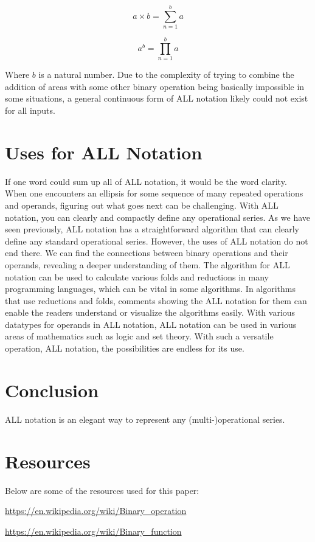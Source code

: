 \documentclass{article}
\begin{document}
$$a \times b = \sum_{n=1}^b a$$

$$a^b = \prod_{n=1}^b a$$

Where $b$ is a natural number. Due to the complexity of trying to combine the addition of areas with some other binary operation being basically impossible in some situations, a general continuous form of ALL notation likely could not exist for all inputs.

\section{Uses for ALL Notation}

If one word could sum up all of ALL notation, it would be the word clarity. When one encounters an ellipsis for some sequence of many repeated operations and operands, figuring out what goes next can be challenging. With ALL notation, you can clearly and compactly define any operational series. As we have seen previously, ALL notation has a straightforward algorithm that can clearly define any standard operational series. However, the uses of ALL notation do not end there. We can find the connections between binary operations and their operands, revealing a deeper understanding of them. The algorithm for ALL notation can be used to calculate various folds and reductions in many programming languages, which can be vital in some algorithms. In algorithms that use reductions and folds, comments showing the ALL notation for them can enable the readers understand or visualize the algorithms easily. With various datatypes for operands in ALL notation, ALL notation can be used in various areas of mathematics such as logic and set theory. With such a versatile operation, ALL notation, the possibilities are endless for its use.

\section{Conclusion}

ALL notation is an elegant way to represent any (multi-)operational series.

\section{Resources}


Below are some of the resources used for this paper:

\url{https://en.wikipedia.org/wiki/Binary_operation}

\url{https://en.wikipedia.org/wiki/Binary_function}
\end{document}
